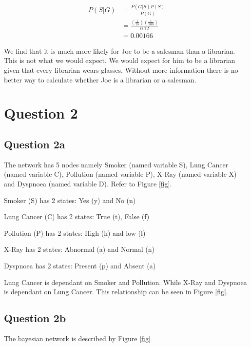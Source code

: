 \documentclass[10pt,a4paper]{article}
\begin{document}
\begin{equation}
\begin{split}
P(S|G) &= \frac{P(G|S)P(S)}{P(G)}\\
       &= \frac{(\frac{1}{25})(\frac{1}{200})}{0.12} \\
       &= 0.00166
\end{split}
\end{equation}

We find that it is much more likely for Joe to be a salesman than a librarian. This is not what we would expect. We would expect for him to be a librarian given that every librarian wears glasses. Without more information there is no better way to calculate whether Joe is a librarian or a salesman.  
\section{Question 2}
\subsection{Question 2a}

The network has 5 nodes namely Smoker (named variable S), Lung Cancer (named variable C), Pollution (named variable P), X-Ray (named variable X) and Dyspnoea (named variable D). Refer to Figure \ref{fig}.
 
Smoker (S) has 2 states: Yes (y) and No (n)

Lung Cancer (C) has 2 states: True (t), False (f)

Pollution (P) has 2 states: High (h) and low (l)

X-Ray has 2 states: Abnormal (a) and Normal (n)

Dyspnoea has 2 states: Present (p) and Absent (a)

Lung Cancer is dependant on Smoker and Pollution. While X-Ray and Dyspnoea is dependant on Lung Cancer. This relationship can be seen in Figure \ref{fig}.

\subsection{Question 2b}
The bayesian network is described by Figure \ref{fig}
\end{document}
